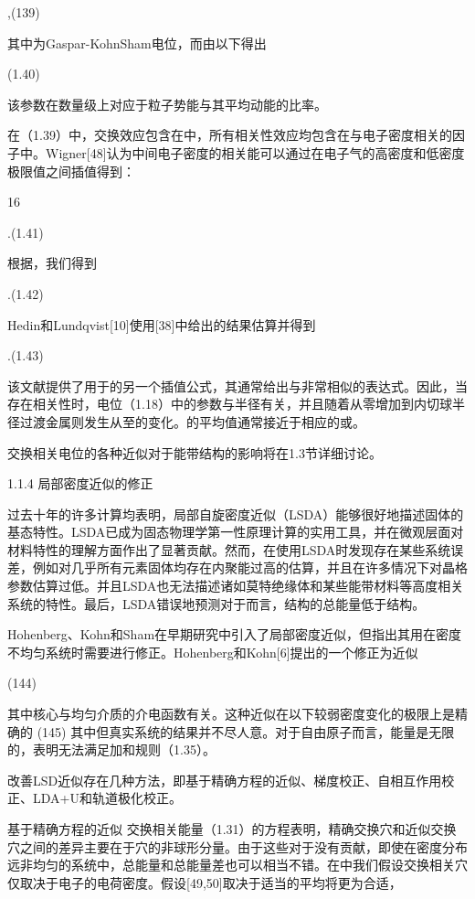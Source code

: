 ,(139)

其中为Gaspar-KohnSham电位，而由以下得出

(1.40)

该参数在数量级上对应于粒子势能与其平均动能的比率。

在（1.39）中，交换效应包含在中，所有相关性效应均包含在与电子密度相关的因子中。Wigner[48]认为中间电子密度的相关能可以通过在电子气的高密度和低密度极限值之间插值得到：


16



.(1.41)

根据，我们得到

.(1.42)

Hedin和Lundqvist[10]使用[38]中给出的结果估算并得到

.(1.43)

该文献提供了用于的另一个插值公式，其通常给出与非常相似的表达式。因此，当存在相关性时，电位（1.18）中的参数与半径有关，并且随着从零增加到内切球半径过渡金属则发生从至的变化。的平均值通常接近于相应的或。

交换相关电位的各种近似对于能带结构的影响将在1.3节详细讨论。

1.1.4  局部密度近似的修正

过去十年的许多计算均表明，局部自旋密度近似（LSDA）能够很好地描述固体的基态特性。LSDA已成为固态物理学第一性原理计算的实用工具，并在微观层面对材料特性的理解方面作出了显著贡献。然而，在使用LSDA时发现存在某些系统误差，例如对几乎所有元素固体均存在内聚能过高的估算，并且在许多情况下对晶格参数估算过低。并且LSDA也无法描述诸如莫特绝缘体和某些能带材料等高度相关系统的特性。最后，LSDA错误地预测对于而言，结构的总能量低于结构。

Hohenberg、Kohn和Sham在早期研究中引入了局部密度近似，但指出其用在密度不均匀系统时需要进行修正。Hohenberg和Kohn[6]提出的一个修正为近似

(144) 

其中核心与均匀介质的介电函数有关。这种近似在以下较弱密度变化的极限上是精确的
(145)
其中但真实系统的结果并不尽人意。对于自由原子而言，能量是无限的，表明无法满足加和规则（1.35）。

改善LSD近似存在几种方法，即基于精确方程的近似、梯度校正、自相互作用校正、LDA+U和轨道极化校正。





基于精确方程的近似   
交换相关能量（1.31）的方程表明，精确交换穴和近似交换穴之间的差异主要在于穴的非球形分量。由于这些对于没有贡献，即使在密度分布远非均匀的系统中，总能量和总能量差也可以相当不错。在中我们假设交换相关穴仅取决于电子的电荷密度。假设[49,50]取决于适当的平均将更为合适，

